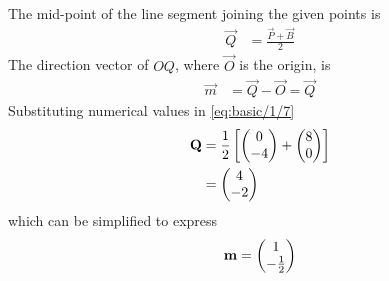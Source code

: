 The mid-point of the line segment joining the given points is 
%
\begin{align}
    \vec{Q} &=\frac{\vec{P}+\vec{B}}{2}
    \label{eq:basic/1/7}
\end{align}
The direction vector of $OQ$, where 
$\vec{O}$ is the origin, is 
\begin{align}
    \vec{m} &= \vec{Q}-\vec{O} = \vec{Q}
\end{align}
Substituting numerical values in 
    \eqref{eq:basic/1/7}
\begin{align}
    \mathbf{Q} 
    &=\frac{1}{2}{}\left[\begin{pmatrix}0\\-4\end{pmatrix}
    +
    \begin{pmatrix}8\\0\end{pmatrix}\right]\\
    &=\begin{pmatrix}4\\-2\end{pmatrix}
\end{align}
which can be simplified to express 
\begin{align}
    \mathbf{m}  
    =\begin{pmatrix}1\\-\frac{1}{2}\end{pmatrix}
\end{align}
